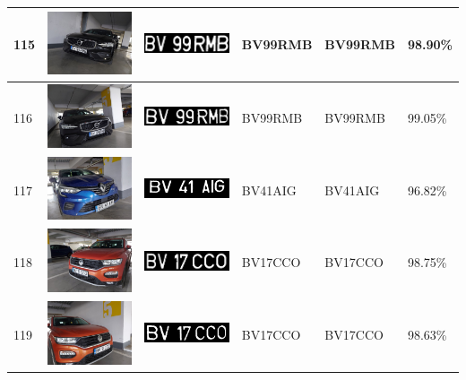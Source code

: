 \documentclass[a4paper,12pt]{report}
\begin{document}
\begin{longtable}{| m{0.6cm} | m{3cm} | m{3cm} | m{1.8cm} | m{1.8cm} | m{1.8cm} |}
        115 & \includegraphics[width=3cm,keepaspectratio]{dataset/67_d1.jpg} & \includegraphics[width=3cm,keepaspectratio]{segmentari/115.jpg} & BV99RMB & BV99RMB & 98.90\% \\ \hline
        116 & \includegraphics[width=3cm,keepaspectratio]{dataset/67_s1.jpg} & \includegraphics[width=3cm,keepaspectratio]{segmentari/116.jpg} & BV99RMB & BV99RMB & 99.05\% \\ \hline
        117 & \includegraphics[width=3cm,keepaspectratio]{dataset/68_s1.jpg} & \includegraphics[width=3cm,keepaspectratio]{segmentari/117.jpg} & BV41AIG & BV41AIG & 96.82\% \\ \hline
        118 & \includegraphics[width=3cm,keepaspectratio]{dataset/69_d1.jpg} & \includegraphics[width=3cm,keepaspectratio]{segmentari/118.jpg} & BV17CCO & BV17CCO & 98.75\% \\ \hline
        119 & \includegraphics[width=3cm,keepaspectratio]{dataset/69_s1.jpg} & \includegraphics[width=3cm,keepaspectratio]{segmentari/119.jpg} & BV17CCO & BV17CCO & 98.63\% \\ \hline

\end{longtable}
\end{document}
